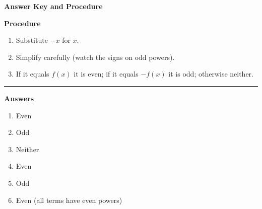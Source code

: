 \documentclass[12pt]{article}
\begin{document}
\begin{center}{\Large \textbf{Answer Key and Procedure}}\end{center}
\vspace{0.3cm}
\textbf{Procedure}
\begin{enumerate}
  \item Substitute $-x$ for $x$.
  \item Simplify carefully (watch the signs on odd powers).
  \item If it equals $f(x)$ it is even; if it equals $-f(x)$ it is odd; otherwise neither.
\end{enumerate}
\vspace{0.4cm}\hrule\vspace{0.4cm}
\textbf{Answers}
\begin{enumerate}[label=\textbf{\arabic*.}]
  \item Even
  \item Odd
  \item Neither
  \item Even
  \item Odd
  \item Even (all terms have even powers)
\end{enumerate}
\end{document}
